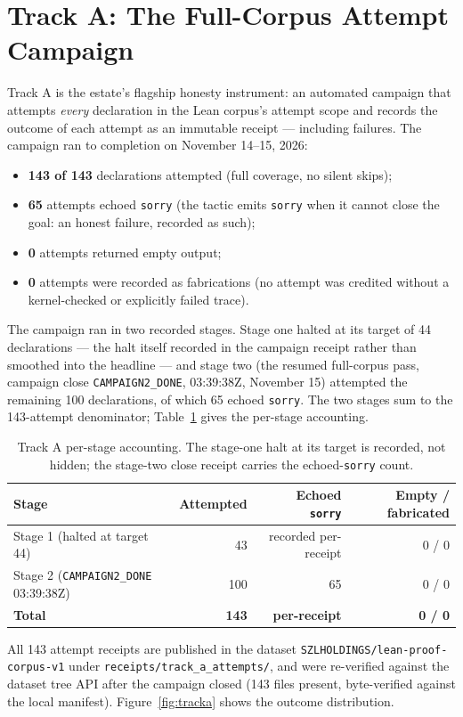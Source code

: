 ﻿\documentclass[11pt]{article}
\begin{document}
\section{Track A: The Full-Corpus Attempt Campaign}
\label{sec:tracka}

Track A is the estate's flagship honesty instrument: an automated campaign that attempts \emph{every} declaration in the Lean corpus's attempt scope and records the outcome of each attempt as an immutable receipt --- including failures. The campaign ran to completion on November 14--15, 2026:

\begin{itemize}
\item \textbf{143 of 143} declarations attempted (full coverage, no silent skips);
\item \textbf{65} attempts echoed \texttt{sorry} (the tactic emits \texttt{sorry} when it cannot close the goal: an honest failure, recorded as such);
\item \textbf{0} attempts returned empty output;
\item \textbf{0} attempts were recorded as fabrications (no attempt was credited without a kernel-checked or explicitly failed trace).
\end{itemize}

The campaign ran in two recorded stages. Stage one halted at its target of 44 declarations --- the halt itself recorded in the campaign receipt rather than smoothed into the headline --- and stage two (the resumed full-corpus pass, campaign close \texttt{CAMPAIGN2\_DONE}, 03:39:38Z, November 15) attempted the remaining 100 declarations, of which 65 echoed \texttt{sorry}. The two stages sum to the 143-attempt denominator; Table~\ref{tab:stages} gives the per-stage accounting.

\begin{table}[htbp]
\centering
\small
\begin{tabular}{lrrr}
\toprule
\textbf{Stage} & \textbf{Attempted} & \textbf{Echoed \texttt{sorry}} & \textbf{Empty / fabricated} \\
\midrule
Stage 1 (halted at target 44) & 43 & recorded per-receipt & 0 / 0 \\
Stage 2 (\texttt{CAMPAIGN2\_DONE} 03:39:38Z) & 100 & 65 & 0 / 0 \\
\midrule
\textbf{Total} & \textbf{143} & \textbf{per-receipt} & \textbf{0 / 0} \\
\bottomrule
\end{tabular}
\caption{Track A per-stage accounting. The stage-one halt at its target is recorded, not hidden; the stage-two close receipt carries the echoed-\texttt{sorry} count.}
\label{tab:stages}
\end{table} All 143 attempt receipts are published in the dataset \texttt{SZLHOLDINGS/lean-proof-corpus-v1} under \texttt{receipts/track\_a\_attempts/}, and were re-verified against the dataset tree API after the campaign closed (143 files present, byte-verified against the local manifest). Figure~\ref{fig:tracka} shows the outcome distribution.
\end{document}
